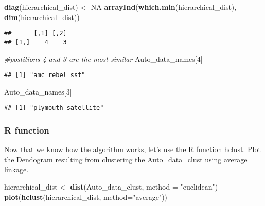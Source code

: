 \documentclass[11pt,]{article}
\newenvironment{Shaded}{\begin{snugshade}}{\end{snugshade}}
\newcommand{\CommentTok}[1]{\textcolor[rgb]{0.56,0.35,0.01}{\textit{#1}}}
\newcommand{\DataTypeTok}[1]{\textcolor[rgb]{0.13,0.29,0.53}{#1}}
\newcommand{\DecValTok}[1]{\textcolor[rgb]{0.00,0.00,0.81}{#1}}
\newcommand{\KeywordTok}[1]{\textcolor[rgb]{0.13,0.29,0.53}{\textbf{#1}}}
\newcommand{\NormalTok}[1]{#1}
\newcommand{\OtherTok}[1]{\textcolor[rgb]{0.56,0.35,0.01}{#1}}
\newcommand{\StringTok}[1]{\textcolor[rgb]{0.31,0.60,0.02}{#1}}
\begin{document}
\begin{Shaded}
\begin{Highlighting}[]
\KeywordTok{diag}\NormalTok{(hierarchical_dist) <-}\StringTok{ }\OtherTok{NA}
\KeywordTok{arrayInd}\NormalTok{(}\KeywordTok{which.min}\NormalTok{(hierarchical_dist), }\KeywordTok{dim}\NormalTok{(hierarchical_dist))}
\end{Highlighting}
\end{Shaded}

\begin{verbatim}
##      [,1] [,2]
## [1,]    4    3
\end{verbatim}

\begin{Shaded}
\begin{Highlighting}[]
\CommentTok{#postitions 4 and 3 are the most similar}
\NormalTok{Auto_data_names[}\DecValTok{4}\NormalTok{]}
\end{Highlighting}
\end{Shaded}

\begin{verbatim}
## [1] "amc rebel sst"
\end{verbatim}

\begin{Shaded}
\begin{Highlighting}[]
\NormalTok{Auto_data_names[}\DecValTok{3}\NormalTok{]}
\end{Highlighting}
\end{Shaded}

\begin{verbatim}
## [1] "plymouth satellite"
\end{verbatim}

\hypertarget{r-function}{%
\subsubsection{R function}\label{r-function}}

Now that we know how the algorithm works, let's use the R function
hclust. Plot the Dendogram resulting from clustering the
Auto\_data\_clust using average linkage.

\begin{Shaded}
\begin{Highlighting}[]
\NormalTok{hierarchical_dist <-}\StringTok{ }\KeywordTok{dist}\NormalTok{(Auto_data_clust, }\DataTypeTok{method =} \StringTok{"euclidean"}\NormalTok{)}
\KeywordTok{plot}\NormalTok{(}\KeywordTok{hclust}\NormalTok{(hierarchical_dist, }\DataTypeTok{method=}\StringTok{"average"}\NormalTok{))}
\end{Highlighting}
\end{Shaded}
\end{document}
